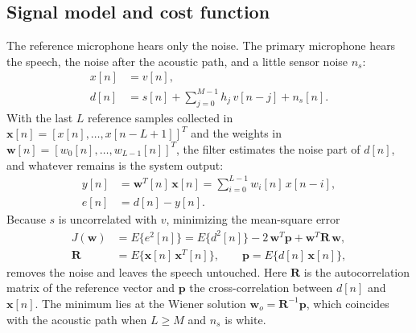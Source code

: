 \subsection{Signal model and cost function}
The reference microphone hears only the noise. The primary microphone hears the speech, the noise after
the acoustic path, and a little sensor noise $n_s$:
\begin{align}
x[n] &= v[n], \label{eq:x}\\
d[n] &= s[n] + \sum_{j=0}^{M-1} h_j\, v[n-j] + n_s[n]. \label{eq:d}
\end{align}
With the last $L$ reference samples collected in $\mathbf{x}[n]=[x[n],\dots,x[n-L+1]]^T$ and the weights
in $\mathbf{w}[n]=[w_0[n],\dots,w_{L-1}[n]]^T$, the filter estimates the noise part of $d[n]$, and
whatever remains is the system output:
\begin{align}
y[n] &= \mathbf{w}^T[n]\,\mathbf{x}[n] = \sum_{i=0}^{L-1} w_i[n]\,x[n-i], \label{eq:y}\\
e[n] &= d[n]-y[n]. \label{eq:e}
\end{align}
Because $s$ is uncorrelated with $v$, minimizing the mean-square error
\begin{align}
J(\mathbf{w}) &= E\{e^2[n]\} = E\{d^2[n]\} - 2\,\mathbf{w}^T\mathbf{p} + \mathbf{w}^T\mathbf{R}\,\mathbf{w}, \label{eq:J}\\
\mathbf{R} &= E\{\mathbf{x}[n]\,\mathbf{x}^T[n]\},\qquad \mathbf{p}=E\{d[n]\,\mathbf{x}[n]\}, \label{eq:Rp}
\end{align}
removes the noise and leaves the speech untouched. Here $\mathbf{R}$ is the autocorrelation matrix of the
reference vector and $\mathbf{p}$ the cross-correlation between $d[n]$ and $\mathbf{x}[n]$. The minimum
lies at the Wiener solution $\mathbf{w}_o=\mathbf{R}^{-1}\mathbf{p}$, which coincides with the acoustic
path when $L\ge M$ and $n_s$ is white.

